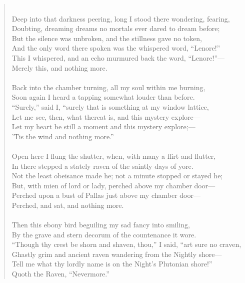\documentclass[12pt, a4paper]{article}
\begin{document}
\begin{quote}
{\\
Deep into that darkness peering, long I stood there wondering, fearing, \\
Doubting, dreaming dreams no mortals ever dared to dream before; \\
But the silence was unbroken, and the stillness gave no token, \\
And the only word there spoken was the whispered word, “Lenore!” \\
This I whispered, and an echo murmured back the word, “Lenore!”— \\
Merely this, and nothing more. \\
\\
Back into the chamber turning, all my soul within me burning, \\
Soon again I heard a tapping somewhat louder than before. \\
“Surely,” said I, “surely that is something at my window lattice, \\
Let me see, then, what thereat is, and this mystery explore— \\
Let my heart be still a moment and this mystery explore;— \\
'Tis the wind and nothing more.” \\
\\
Open here I flung the shutter, when, with many a flirt and flutter, \\
In there stepped a stately raven of the saintly days of yore. \\
Not the least obeisance made he; not a minute stopped or stayed he; \\
But, with mien of lord or lady, perched above my chamber door— \\
Perched upon a bust of Pallas just above my chamber door— \\
Perched, and sat, and nothing more. \\
\\
Then this ebony bird beguiling my sad fancy into smiling, \\
By the grave and stern decorum of the countenance it wore. \\
“Though thy crest be shorn and shaven, thou,” I said, “art sure no craven, \\
Ghastly grim and ancient raven wandering from the Nightly shore— \\
Tell me what thy lordly name is on the Night's Plutonian shore!” \\
Quoth the Raven, “Nevermore.” \\
}
\end{quote}
\end{document}
